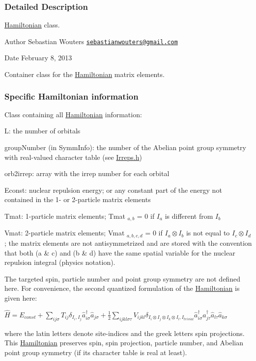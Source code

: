 \subsubsection{Detailed Description}
\hyperlink{classCheMPS2_1_1Hamiltonian}{Hamiltonian} class. \begin{DoxyAuthor}{Author}
Sebastian Wouters \href{mailto:sebastianwouters@gmail.com}{\tt sebastianwouters@gmail.\-com} 
\end{DoxyAuthor}
\begin{DoxyDate}{Date}
February 8, 2013
\end{DoxyDate}
Container class for the \hyperlink{classCheMPS2_1_1Hamiltonian}{Hamiltonian} matrix elements.\hypertarget{classCheMPS2_1_1Hamiltonian_ham_info}{}\subsubsection{Specific Hamiltonian information}\label{classCheMPS2_1_1Hamiltonian_ham_info}
Class containing all \hyperlink{classCheMPS2_1_1Hamiltonian}{Hamiltonian} information\-:\par

\begin{DoxyItemize}
\item L\-: the number of orbitals
\item group\-Number (in Symm\-Info)\-: the number of the Abelian point group symmetry with real-\/valued character table (see \hyperlink{Irreps_8h_source}{Irreps.\-h})
\item orb2irrep\-: array with the irrep number for each orbital
\item Econst\-: nuclear repulsion energy; or any constant part of the energy not contained in the 1-\/ or 2-\/particle matrix elements
\item Tmat\-: 1-\/particle matrix elements; Tmat $_{a,b}$ = 0 if $I_a$ is different from $I_b$
\item Vmat\-: 2-\/particle matrix elements; Vmat $_{a,b,c,d}$ = 0 if $I_a \otimes I_b$ is not equal to $I_c \otimes I_d$; the matrix elements are not antisymmetrized and are stored with the convention that both (a \& c) and (b \& d) have the same spatial variable for the nuclear repulsion integral (physics notation).
\end{DoxyItemize}

The targeted spin, particle number and point group symmetry are not defined here. For convenience, the second quantized formulation of the \hyperlink{classCheMPS2_1_1Hamiltonian}{Hamiltonian} is given here\-: \par
 $ \hat{H} = E_{const} + \sum\limits_{ij\sigma} T_{ij} \delta_{I_i,I_j} \hat{a}_{i \sigma}^{\dagger} \hat{a}_{j \sigma} + \frac{1}{2} \sum\limits_{ijkl\sigma\tau} V_{ijkl} \delta_{I_i \otimes I_j \otimes I_k \otimes I_l, I_{trivial}} \hat{a}_{i \sigma}^{\dagger} \hat{a}_{j \tau}^{\dagger} \hat{a}_{l \tau} \hat{a}_{k \sigma} $\par
 where the latin letters denote site-\/indices and the greek letters spin projections. This \hyperlink{classCheMPS2_1_1Hamiltonian}{Hamiltonian} preserves spin, spin projection, particle number, and Abelian point group symmetry (if its character table is real at least). 

